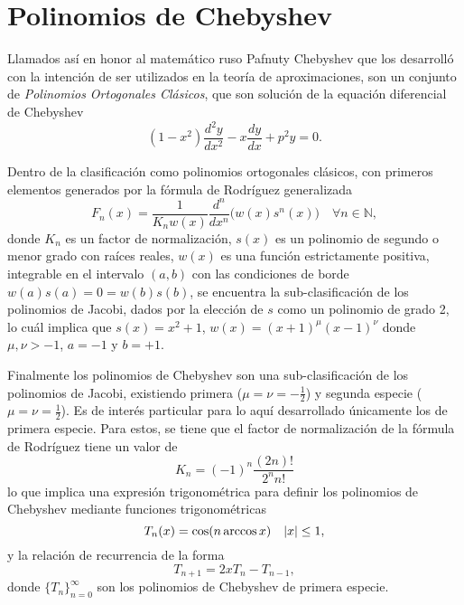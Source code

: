 \section{Polinomios de Chebyshev}
Llamados así en honor al matemático ruso {Pafnuty Chebyshev} que los desarrolló
con la intención de ser utilizados en la teoría de aproximaciones, son un conjunto de 
\emph{Polinomios Ortogonales Clásicos}, que son solución de la equación diferencial de Chebyshev 
\begin{equation*}
	(1-x^2) \frac{d^2 y}{d x^2} - x \frac{d y}{d x} + p^2 y = 0.
\end{equation*}

Dentro de la clasificación como polinomios ortogonales clásicos, con primeros elementos generados por la 
fórmula de Rodríguez generalizada
\begin{equation*}
	F_n(x) = \frac{1}{K_nw(x)} \frac{d^n}{dx^n} \big(w(x)s^n(x)\big) \quad \forall n \in \mathbb N,
\end{equation*}
donde $K_n$ es un factor de normalización, $s(x)$ es un polinomio de segundo o menor grado con raíces
reales, $w(x)$ es una función estrictamente positiva, integrable en el intervalo $(a, b)$ con las
condiciones de borde $w(a) s(a)=0=w(b) s(b)$, se encuentra la sub-clasificación de los polinomios de
Jacobi, dados por la elección de $s$ como un polinomio de grado 2, lo cuál implica que $s(x) = x^2 + 1$, 
$w(x) = (x+1)^\mu (x-1)^\nu$ donde $\mu, \nu > -1$, $a=-1$ y $b=+1$.

Finalmente los polinomios de Chebyshev son una sub-clasificación de los polinomios de Jacobi, existiendo
primera ($\mu = \nu = -\frac12$) y segunda especie ($\mu = \nu = \frac12$). Es de interés particular para
lo aquí desarrollado únicamente los de primera especie. Para estos, se tiene que el factor de
normalización de la fórmula de Rodríguez tiene un valor de 
\begin{equation*}K_{n}=(-1)^{n} \frac{(2 n) !}{2^{n} n !}\end{equation*}
lo que implica una expresión trigonométrica para definir los polinomios de Chebyshev mediante funciones trigonométricas
\begin{equation}\label{eq:ChebyshevPol}
 T_n(x) = \cos(n\arccos x) \quad \abs{x} \leq 1,
\end{equation} 
y la relación de recurrencia de la forma 
\begin{equation*}\label{eq:chebyshevRecurrence}
	T_{n+1} = 2xT_n - T_{n-1},
\end{equation*} donde
$\{T_n\}_{n=0}^\infty$ son los polinomios de Chebyshev de primera especie.
